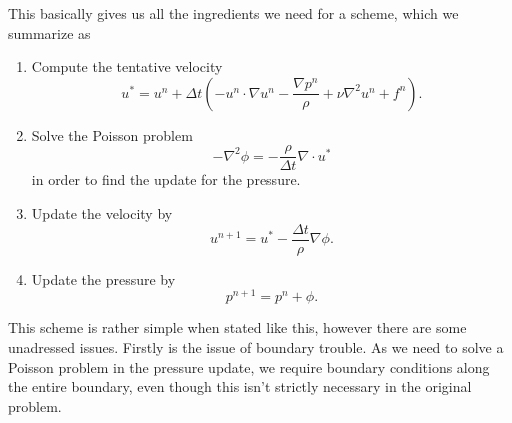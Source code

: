 This basically gives us all the ingredients we need for a scheme, which we summarize as
\begin{enumerate}
    \item Compute the tentative velocity
        \begin{equation}
            u^*  = u^n + \Delta t \left(
                - u^n \cdot \nabla u^n
                -\frac{\nabla p^n}{\rho}
                + \nu \nabla^2 u^n
                + f^n
            \right).
        \end{equation}

    \item Solve the Poisson problem
        \begin{equation}\label{eq:possion}
            -\nabla^2 \phi = -\frac{\rho}{\Delta t} \nabla \cdot u^*
        \end{equation}
        in order to find the update for the pressure.

    \item Update the velocity by
        \begin{equation}
            u^{n + 1} = u^* - \frac{\Delta t}{\rho} \nabla \phi.
        \end{equation}

    \item Update the pressure by
        \begin{equation}
            p^{n + 1} = p^n + \phi.
        \end{equation}
\end{enumerate}
This scheme is rather simple when stated like this, however there are some unadressed issues.
Firstly is the issue of boundary trouble.
As we need to solve a Poisson problem in the pressure update, we require boundary conditions along the entire boundary, even though this isn't strictly necessary in the original problem.

